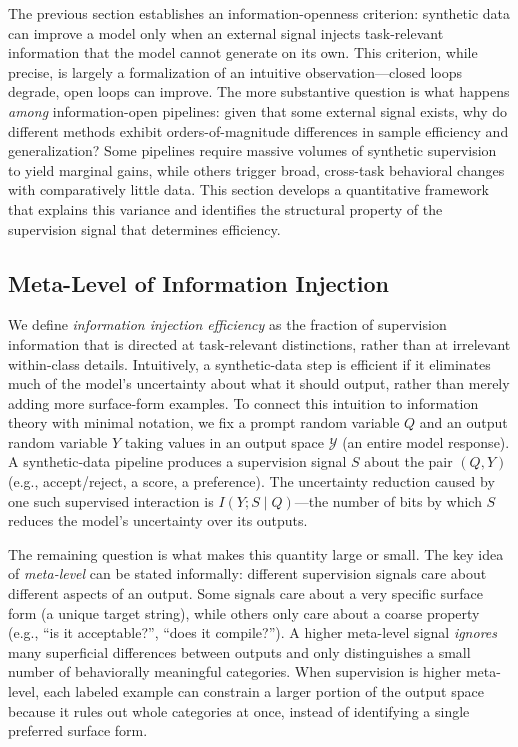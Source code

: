 \documentclass{article}
\theoremstyle{plain}
\theoremstyle{definition}
\theoremstyle{remark}
\begin{document}
The previous section establishes an information-openness criterion: synthetic data can improve a model only when an external signal injects task-relevant information that the model cannot generate on its own. This criterion, while precise, is largely a formalization of an intuitive observation---closed loops degrade, open loops can improve. The more substantive question is what happens \textit{among} information-open pipelines: given that some external signal exists, why do different methods exhibit orders-of-magnitude differences in sample efficiency and generalization? Some pipelines require massive volumes of synthetic supervision to yield marginal gains, while others trigger broad, cross-task behavioral changes with comparatively little data. This section develops a quantitative framework that explains this variance and identifies the structural property of the supervision signal that determines efficiency.

\subsection{Meta-Level of Information Injection}
\label{sec:meta-level}

We define \textit{information injection efficiency} as the fraction of supervision information that is directed at task-relevant distinctions, rather than at irrelevant within-class details. Intuitively, a synthetic-data step is efficient if it eliminates much of the model's uncertainty about what it should output, rather than merely adding more surface-form examples. To connect this intuition to information theory with minimal notation, we fix a prompt random variable $Q$ and an output random variable $Y$ taking values in an output space $\mathcal{Y}$ (an entire model response). A synthetic-data pipeline produces a supervision signal $S$ about the pair $(Q,Y)$ (e.g., accept/reject, a score, a preference). The uncertainty reduction caused by one such supervised interaction is $I(Y;S \mid Q)$---the number of bits by which $S$ reduces the model's uncertainty over its outputs.

The remaining question is what makes this quantity large or small. The key idea of \textit{meta-level} can be stated informally: different supervision signals care about different aspects of an output. Some signals care about a very specific surface form (a unique target string), while others only care about a coarse property (e.g., ``is it acceptable?'', ``does it compile?''). A higher meta-level signal \textit{ignores} many superficial differences between outputs and only distinguishes a small number of behaviorally meaningful categories. When supervision is higher meta-level, each labeled example can constrain a larger portion of the output space because it rules out whole categories at once, instead of identifying a single preferred surface form.
\end{document}
